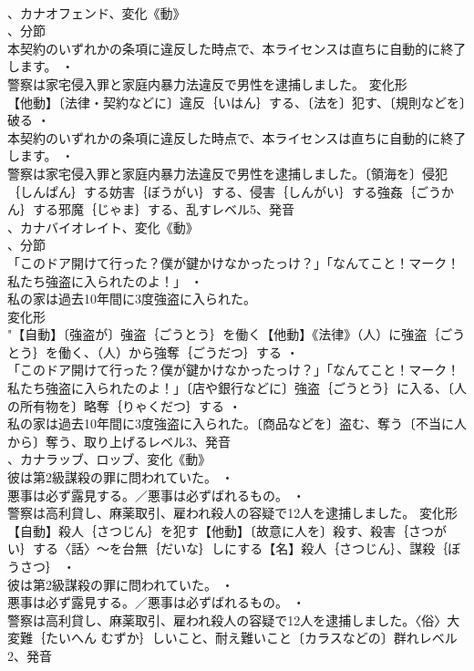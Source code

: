 \documentclass[8pt]{extreport}
\begin{document}
\begin{CJK}{UTF8}{min}
\\	、カナオフェンド、変化《動》
\\	、分節
\\	本契約のいずれかの条項に違反した時点で、本ライセンスは直ちに自動的に終了します。 ・
\\	警察は家宅侵入罪と家庭内暴力法違反で男性を逮捕しました。	変化形 
\\	【他動】〔法律・契約などに〕違反｛いはん｝する、〔法を〕犯す、〔規則などを〕破る ・
\\	本契約のいずれかの条項に違反した時点で、本ライセンスは直ちに自動的に終了します。 ・
\\	警察は家宅侵入罪と家庭内暴力法違反で男性を逮捕しました。〔領海を〕侵犯｛しんぱん｝する妨害｛ぼうがい｝する、侵害｛しんがい｝する強姦｛ごうかん｝する邪魔｛じゃま｝する、乱すレベル5、発音
\\	、カナバイオレイト、変化《動》
\\	、分節
\\	「このドア開けて行った？僕が鍵かけなかったっけ？」「なんてこと！マーク！私たち強盗に入られたのよ！」 ・
\\	私の家は過去10年間に3度強盗に入られた。
\\	変化形 
\\	"【自動】〔強盗が〕強盗｛ごうとう｝を働く【他動】《法律》（人）に強盗｛ごうとう｝を働く、（人）から強奪｛ごうだつ｝する ・
\\	「このドア開けて行った？僕が鍵かけなかったっけ？」「なんてこと！マーク！私たち強盗に入られたのよ！」〔店や銀行などに〕強盗｛ごうとう｝に入る、〔人の所有物を〕略奪｛りゃくだつ｝する ・
\\	私の家は過去10年間に3度強盗に入られた。〔商品などを〕盗む、奪う〔不当に人から〕奪う、取り上げるレベル3、発音
\\	、カナラッブ、ロッブ、変化《動》
\\	彼は第2級謀殺の罪に問われていた。 ・
\\	悪事は必ず露見する。／悪事は必ずばれるもの。 ・
\\	警察は高利貸し、麻薬取引、雇われ殺人の容疑で12人を逮捕しました。	変化形 
\\	【自動】殺人｛さつじん｝を犯す【他動】〔故意に人を〕殺す、殺害｛さつがい｝する〈話〉～を台無｛だいな｝しにする【名】殺人｛さつじん｝、謀殺｛ぼうさつ｝ ・
\\	彼は第2級謀殺の罪に問われていた。 ・
\\	悪事は必ず露見する。／悪事は必ずばれるもの。 ・
\\	警察は高利貸し、麻薬取引、雇われ殺人の容疑で12人を逮捕しました。〈俗〉大変難｛たいへん むずか｝しいこと、耐え難いこと〔カラスなどの〕群れレベル2、発音

\end{CJK}
\end{document}

